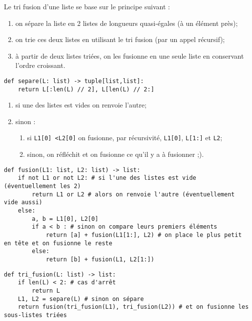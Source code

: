 
Le tri fusion d'une liste se base sur le principe suivant : 
\begin{enumerate}
\item on sépare la liste en 2 listes de longueurs quasi-égales (à un élément près);
\item on trie ces deux listes en utilisant le tri fusion (par un appel récursif);
\item à partir de deux listes triées, on les fusionne en une seule liste en conservant l'ordre croissant.
\end{enumerate}

\ifprof
\begin{lstlisting}
def separe(L: list) -> tuple[list,list]:
    return L[:len(L) // 2], L[len(L) // 2:]
\end{lstlisting}
\else
\fi


\itshape
\begin{enumerate}
\item si une des listes est vides on renvoie l'autre;
\item sinon : 
\begin{enumerate}
\item si \texttt{L1[0] <L2[0]} on fusionne, par récursivité, \texttt{L1[0]}, \texttt{L[1:]} et \texttt{L2};
\item sinon, on réfléchit et on fusionne ce qu'il y a à fusionner ;).
\end{enumerate}
\end{enumerate}
\normalshape

\ifprof
\begin{lstlisting}
def fusion(L1: list, L2: list) -> list:
    if not L1 or not L2: # si l'une des listes est vide (éventuellement les 2)
        return L1 or L2 # alors on renvoie l'autre (éventuellement vide aussi)
    else:
        a, b = L1[0], L2[0] 
        if a < b : # sinon on compare leurs premiers éléments
            return [a] + fusion(L1[1:], L2) # on place le plus petit en tête et on fusionne le reste
        else:
            return [b] + fusion(L1, L2[1:])
\end{lstlisting}
\else
\fi




\ifprof
\begin{lstlisting}
def tri_fusion(L: list) -> list:
    if len(L) < 2: # cas d'arrêt
        return L
    L1, L2 = separe(L) # sinon on sépare
    return fusion(tri_fusion(L1), tri_fusion(L2)) # et on fusionne les sous-listes triées
\end{lstlisting}
\else
\fi
